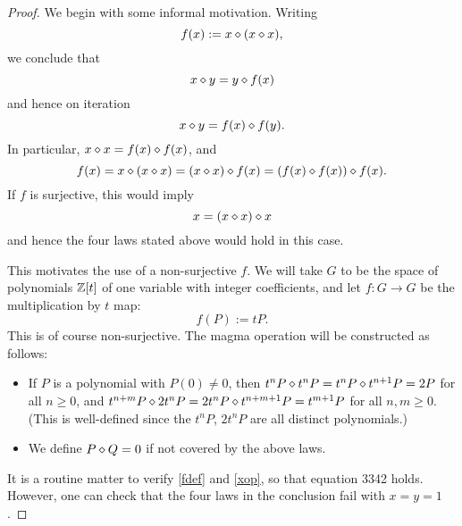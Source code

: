 \begin{proof}
We begin with some informal motivation. Writing
\begin{equation}\label{fdef}
  f(x) := x \diamond (x \diamond x),
\end{equation}
we conclude that
\begin{equation}\label{xop}
   x \diamond y = y \diamond f(x)
\end{equation}
and hence on iteration
$$ x \diamond y = f(x) \diamond f(y).$$
In particular, $x \diamond x = f(x) \diamond f(x)$, and
$$ f(x) = x \diamond (x \diamond x) = (x \diamond x) \diamond f(x) = (f(x) \diamond f(x)) \diamond f(x).$$
If $f$ is surjective, this would imply
$$ x = (x \diamond x) \diamond x$$
and hence the four laws stated above would hold in this case.

This motivates the use of a non-surjective $f$.  We will take $G$ to be the space of polynomials $\mathbb{Z}[t]$ of one variable with integer coefficients, and let $f: G \to G$ be the multiplication by $t$ map:
$$ f(P) := tP.$$
This is of course non-surjective. The magma operation will be constructed as follows:
\begin{itemize}
  \item If $P$ is a polynomial with $P(0) \neq 0$, then $t^n P \diamond t^n P = t^n P \diamond t^{n+1} P = 2P$ for all $n \geq 0$, and $t^{n+m} P \diamond 2t^n P = 2t^n P \diamond t^{n+m+1} P = t^{m+1} P$ for all $n, m \geq 0$.  (This is well-defined since the $t^n P$, $2t^n P$ are all distinct polynomials.)
  \item We define $P \diamond Q = 0$ if not covered by the above laws.
\end{itemize}

It is a routine matter to verify \eqref{fdef} and \eqref{xop}, so that equation 3342 holds.  However, one can check that the four laws in the conclusion fail with $x=y=1$.
\end{proof}

